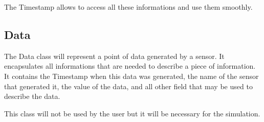 The Timestamp allows to access all these informations and use them smoothly.

\subsection{Data}

The Data class will represent a point of data generated by a sensor. It
encapsulates all informations that are needed to describe a piece of
information. It contains the Timestamp when this data was generated, the name
of the sensor that generated it, the value of the data, and all other field
that may be used to describe the data.

This class will not be used by the user but it will be necessary for the
simulation.
